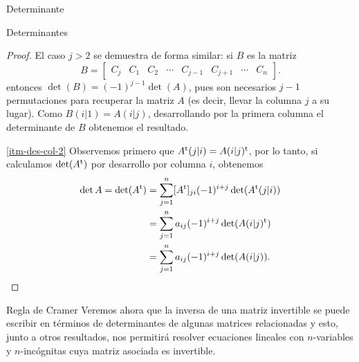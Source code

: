 \begin{chapter}{Determinante}
\begin{section}{Determinantes}
\begin{proof}
                 El caso $j>2$  se demuestra de forma similar: si $B$ es la matriz
                 $$
                 B = \begin{bmatrix} C_j &C_1 &C_2 &\cdots& C_{j-1}&C_{j+1}&\cdots &C_n\end{bmatrix}.
                 $$        
                 entonces $\det(B)=(-1)^{j-1}\det(A)$, pues son necesarios $j-1$ permutaciones para recuperar la matriz $A$ (es decir, llevar la columna $j$ a su lugar).
                 Como $B(i|1) = A(i|j)$,  desarrollando por la primera columna el determinante de $B$ obtenemos el resultado.  
                 
                 
                 \ref{itm-des-col-2} Observemos primero que $A^{\operatorname{t}}(j|i) = A(i|j)^{\operatorname{t}}$, por lo tanto, si calculamos $\det(A^{\operatorname{t}})$ por desarrollo por columna $i$, obtenemos 
                 \begin{align*}
                 \det A = \det(A^{\operatorname{t}})&=\sum_{j=1}^{n} [A^{\operatorname{t}}]_{ji} (-1)^{i+j}\det (A^{\operatorname{t}}(j|i)) \\
                 &=  \sum_{j=1}^{n} a_{ij} (-1)^{i+j}\det (A(i|j)^{\operatorname{t}}) \\
                 &= \sum_{j=1}^{n} a_{ij} (-1)^{i+j}\det (A(i|j)).
                 \end{align*}
                 
                 
             \end{proof}
             
             
            \end{section}
        
             
             
             \begin{section}{Regla de Cramer}\label{seccion-regla-de-cramer} Veremos ahora que la inversa de una matriz invertible se puede escribir en términos de determinantes de algunas matrices relacionadas y esto, junto a otros resultados, nos permitirá resolver ecuaciones lineales con $n$-variables y $n$-incógnitas cuya matriz asociada es invertible.  
                 

\end{section}
\end{chapter}
